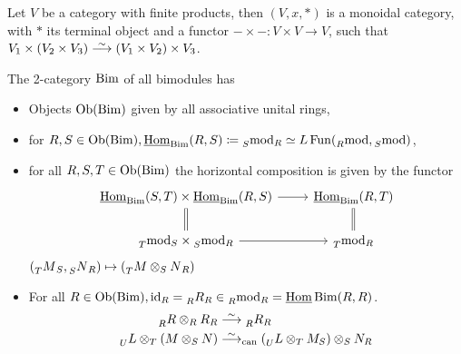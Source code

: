\begin{exmp}
	Let $ V $ be a category with finite products, then $ ( V , x , * ) $ is a monoidal category, with $ * $ its terminal object and a functor $ - \times - \colon V \times V \to V $, such that $ V_1 \times ( V_2 \times V_3 ) \isomorphism ( V_1 \times V_2 ) \times V_3$.
\end{exmp}

\begin{exmp}	
	The 2-category $\operatorname{Bim}$ of all bimodules has 
	\begin{itemize}
		\item 
		Objects $ \operatorname{Ob} ( \operatorname{Bim} ) $ given by all associative unital rings,
		
		\item 
		for $ R , S \in \operatorname{Ob} ( \operatorname{Bim} ), \operatorname{\underline{Hom}}_{\operatorname{Bim}} ( R , S ) \coloneqq \prescript{}{S}{\operatorname{mod}}_R \simeq L \operatorname{Fun} ( \prescript{}{R}{\operatorname{mod}}, \prescript{}{S}{\operatorname{mod}})$,
		
		\item 
		for all $ R , S , T \in \operatorname{Ob} ( \operatorname{Bim} ) $ the horizontal composition is given by the functor 
		\[
		\begin{tikzcd}
			\twoHom_{ \Bim } ( S , T ) \times \twoHom_{ \Bim } ( R , S )
			\ar[r]
			\ar[d, equal]
			&
			\twoHom_{ \Bim } ( R , T )
			\ar[d, equal]
			\\
			\prescript{}{ T }{ \Mod }_S \times \prescript{}{ S }{ \Mod }_R
			\ar[r]
			&
			\prescript{}{ T }{ \Mod }_R 
		\end{tikzcd}
		\] 
		$ ( \prescript{}{ T }{ M }_S , \prescript{}{ S }{ N }_R ) \mapsto (\prescript{}{ T }{ M \otimes_S N }_R ) $
		
		\item 
		For all $ R \in \operatorname{Ob} ( \operatorname{Bim} ), \operatorname{id}_R = \prescript{}{R}{R}_R \in \prescript{}{R}{\operatorname{mod}}_R=\operatorname{\underline{Hom}}{\operatorname{Bim}}( R , R )$.
		\begin{align*}
			\prescript{}{R}{R} \otimes_R R_R 
			&\isomorphism 
			\prescript{}{R}{R}_R
			\\
			\prescript{}{U}{L} \otimes_T ( M \otimes_S N )
			&\isomorphism_{\can}
			( \prescript{}{U}{L} \otimes_T M_S ) \otimes_S N_R
		\end{align*}
	\end{itemize}
\end{exmp}

